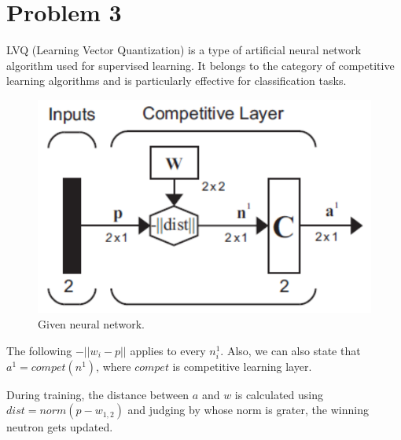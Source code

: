 \section{Problem 3}

LVQ (Learning Vector Quantization) is a type of artificial neural network algorithm used for supervised learning. It belongs to the category of competitive learning algorithms and is particularly effective for classification tasks.

\begin{figure}[htpb]
	\centering
	\includegraphics[width=0.4\linewidth]{../Problem 3/prob3_lvq_nn.png}
	\caption{Given neural network.}
\end{figure}

The following $-||w_i - p||$ applies to every $n^1_i$. Also, we can also state that $a^1 = compet\left(n^1\right)$, where $compet$ is competitive learning layer.

During training, the distance between $a$ and $w$ is calculated using $dist = norm\left(p-w_{1,2}\right)$ and judging by whose norm is grater, the winning neutron gets updated.